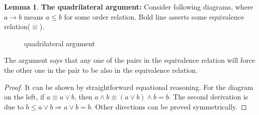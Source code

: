 \documentclass{article}
\theoremstyle{definition}
\newtheorem{lemma}{Lemma}
\begin{document}
\begin{lemma}
  \cite[6.13, 6.14]{lattice} \textbf{The quadrilateral argument: } Consider following
  diagrams, where $a \to b$ means $a \le b$ for some order relation. Bold line asserts
  some equivalence relation($\equiv$).

  \begin{figure}[H]
    \begin{multicols}{2}
      \begin{figure}[H]
        \centering
      \end{figure}

      \begin{figure}[H]
        \centering
      \end{figure}
    \end{multicols}
    \caption{quadrilateral argument}
  \end{figure}

  The argument says that any one of the pairs in the equivalence relation will force
  the other one in the pair to be also in the equivalence relation.
\end{lemma}

\begin{proof}
  It can be shown by straightforward equational reasoning. For the diagram on the
  left, if $a \equiv a \vee b$, then $a \wedge b \equiv (a \vee b) \wedge b = b$. The
  second derivation is due to $b \le a \vee b \Rightarrow a \vee b = b$. Other
  directions can be proved symmetrically.
\end{proof}
\end{document}
